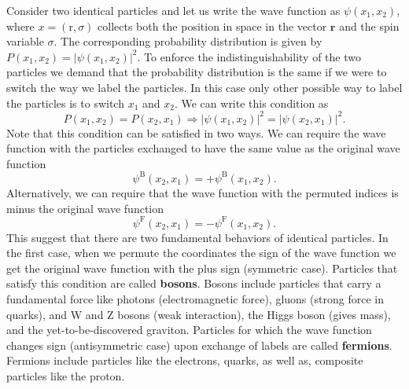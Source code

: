 \documentclass[../Main/chem331-notes.tex]{subfiles}
\begin{document}
Consider two identical particles and let us write the wave function as $\psi(x_1,x_2)$, where $x = (\mathrm{r},\sigma)$ collects both the position in space in the vector $\mathbf{r}$ and the spin variable $\sigma$.
The corresponding probability distribution is given by $P(x_1,x_2) = |\psi(x_1,x_2)|^2$.
To enforce the indistinguishability of the two particles we demand that the probability distribution is the same if we were to switch the way we label the particles. In this case only other possible way to label the particles is to switch $x_1$ and $x_2$. We can write this condition as
\begin{equation}
P(x_1,x_2) = P(x_2,x_1) \Rightarrow  |\psi(x_1,x_2)|^2 = |\psi(x_2,x_1)|^2.
\end{equation}
Note that this condition can be satisfied in two ways.
We can require the wave function with the particles exchanged to have the same value as the original wave function
\begin{equation}
\psi^\mathrm{B}(x_2,x_1) = +\psi^\mathrm{B}(x_1,x_2).
\label{eq:manyelectronatoms:bosons}
\end{equation}
Alternatively, we can require that the wave function with the permuted indices is minus the original wave function
\begin{equation}
\psi^\mathrm{F}(x_2,x_1) = - \psi^\mathrm{F}(x_1,x_2).
\label{eq:manyelectronatoms:fermions}
\end{equation}
This suggest that there are two fundamental behaviors of identical particles.
In the first case, when we permute the coordinates the sign of the wave function we get the original wave function with the plus sign (symmetric case). Particles that satisfy this condition are called \textbf{bosons}.
Bosons include particles that carry a fundamental force  like photons (electromagnetic force), gluons (strong force in quarks), and W and Z bosons (weak interaction), the Higgs boson (gives mass), and the yet-to-be-discovered graviton.
Particles for which the wave function changes sign (antisymmetric case) upon exchange of labels are called \textbf{fermions}. Fermions include particles like the electrons, quarks, as well as, composite particles like the proton.
\end{document}
